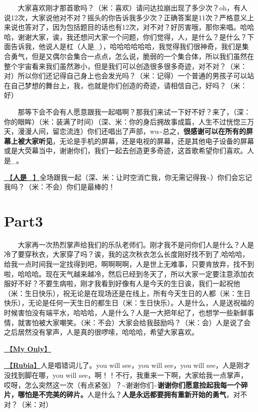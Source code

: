 \documentclass[]{ctexbook}
\begin{document}
  大家喜欢刚才那首歌吗？（米：喜欢）请问达拉崩出现了多少次？oh，有人说12次，大家说他对不对？摇头的你告诉我多少次？正确答案是11次？严格意义上来说也答对了，因为包括题目的话也有12次，对不对？好厉害哦，那你来唱。哈哈哈，谢谢大家，诶，我还想问大家一个问题，你们觉得，人，是什么？是什么？下面告诉我，他说人是杠（人是\_），哈哈哈哈哈哈，我觉得我们很神奇，我们是集合勇气，但是又偶尔会集合一点点，怎么说，脆弱的一个集合体，所以我们虽然在整个宇宙看来我们虽然渺小，但是我们可以创造很多很多奇迹，对不对？（米：对）所以你们还记得自己身上也会发光吗？（米：记得）一个普通的男孩子可以站在自己梦想的舞台上，我，也就是你们创造的奇迹，请相信自己，好吗？（米：好）

  那等下会不会有人愿意跟我一起唱啊？那我们来试一下好不好？来了，（深：你的眼眸）（米：装满了时间）（深、米：你的身后拥故事成篇，人生不过恍惚三万天，漫漫人间，留恋流连）你们还唱出了声部，wu\textasciitilde 总之，\textbf{很感谢可以在所有的屏幕上被大家听见}，无论是手机的屏幕，还是电视的屏幕，还是其他电子设备的屏幕或是大荧幕当中，谢谢你们，我们一起去创造更多奇迹，这首歌希望你们喜欢。人是\_。

\hyperref[renshi]{🎵【\textbf{人是\_}】}全场跟我一起（深、米：让时空消亡我，你无需记得我\textasciitilde）你们会忘记我吗？（米：不会）你们是最棒的！

\section{Part3}\label{nanchang-20241123-part3}

  大家再一次热烈掌声给我们的乐队老师们。刚才我不是问你们人是什么？人是冷了要穿秋衣，大家穿了吗？诶，我的这次秋衣怎么长度刚好找不到了,哈哈哈，给我一点时间我一定找得到吧，啊啊啊啊，人是世上无难事，只要肯放弃，找不到啦，哈哈哈。现在天气越来越冷，然后已经到冬天了，所以大家一定要注意添加衣服好不好？不要生病啦，刚才我看到好像有人是今天的生日诶，我们一起祝他（米：生日快乐），祝无论是在现场还是在线上，所有今天生日的人都（米：生日快乐），无论是任何一天生日的都生日（米：生日快乐）。人是什么，人是送祝福的时候害怕没有端平水，哈哈哈，人是什么？人是一大把年纪了，也想学一些新鲜事情，就害怕被大家嘲笑。（米：不会）大家会给我鼓励吗？（米：会）人是说了会之后居然没有掌声，人是真的很啰嗦，哈哈哈，希望大家喜欢。

\hyperref[my-only]{🎵【\textbf{My Only}】}

\hyperref[rubia]{🎵【\textbf{Rubia}】}人是唱错词儿了。you will see，you will see，you will see，人是刚才没找到脚在哪，you will see，啊！！不行，我重来一下啊，大家给我一点掌声，哎呀，怎么突然这一次（有点紧张）？\textasciitilde 谢谢你们\textasciitilde{}\textbf{谢谢你们愿意捡起我每一个碎片，哪怕是不完美的碎片。}人是什么？\textbf{人是永远都要拥有重新开始的勇气}，对不对？（米：对）
\end{document}
